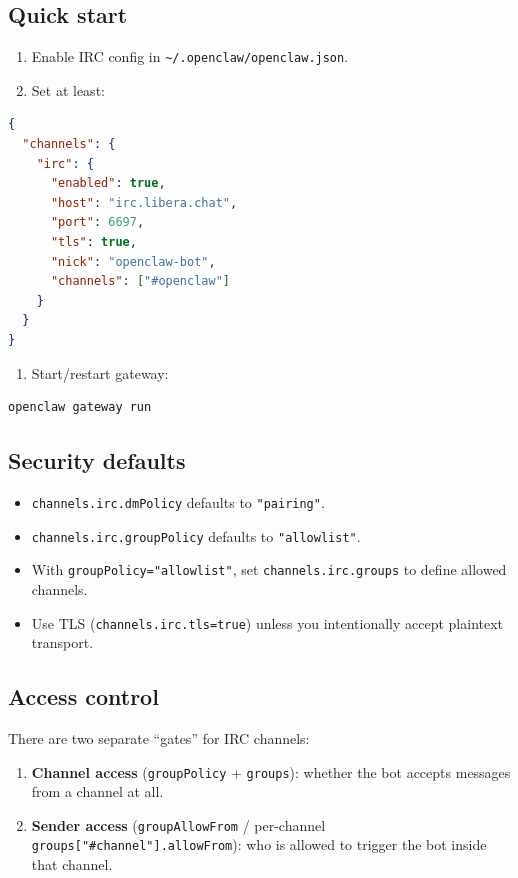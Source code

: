 \subsection{Quick start}


\begin{enumerate}
  \item Enable IRC config in \texttt{\textasciitilde{}/.openclaw/openclaw.json}.
  \item Set at least:
\end{enumerate}


\begin{lstlisting}[language=json]
{
  "channels": {
    "irc": {
      "enabled": true,
      "host": "irc.libera.chat",
      "port": 6697,
      "tls": true,
      "nick": "openclaw-bot",
      "channels": ["#openclaw"]
    }
  }
}
\end{lstlisting}


\begin{enumerate}
  \item Start/restart gateway:
\end{enumerate}


\begin{lstlisting}[language=bash]
openclaw gateway run
\end{lstlisting}


\subsection{Security defaults}


\begin{itemize}
  \item \texttt{channels.irc.dmPolicy} defaults to \texttt{"pairing"}.
  \item \texttt{channels.irc.groupPolicy} defaults to \texttt{"allowlist"}.
  \item With \texttt{groupPolicy="allowlist"}, set \texttt{channels.irc.groups} to define allowed channels.
  \item Use TLS (\texttt{channels.irc.tls=true}) unless you intentionally accept plaintext transport.
\end{itemize}


\subsection{Access control}


There are two separate “gates” for IRC channels:

\begin{enumerate}
  \item \textbf{Channel access} (\texttt{groupPolicy} + \texttt{groups}): whether the bot accepts messages from a channel at all.
  \item \textbf{Sender access} (\texttt{groupAllowFrom} / per-channel \texttt{groups["\#channel"].allowFrom}): who is allowed to trigger the bot inside that channel.
\end{enumerate}


